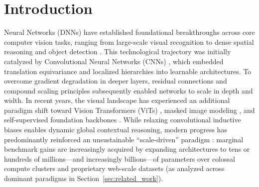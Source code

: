 \section{Introduction}
 Neural Networks (DNNs) have established foundational breakthroughs across core computer vision tasks, ranging from large-scale visual recognition \cite{8, 19} to dense spatial reasoning and object detection \cite{10, 37}. This technological trajectory was initially catalyzed by Convolutional Neural Networks (CNNs) \cite{15, 18}, which embedded translation equivariance and localized hierarchies into learnable architectures. To overcome gradient degradation in deeper layers, residual connections \cite{10} and compound scaling principles \cite{30} subsequently enabled networks to scale in depth and width. In recent years, the visual landscape has experienced an additional paradigm shift toward Vision Transformers (ViTs) \cite{6, 33}, masked image modeling \cite{34}, and self-supervised foundation backbones \cite{1}. While relaxing convolutional inductive biases enables dynamic global contextual reasoning, modern progress has predominantly reinforced an unsustainable ``scale-driven'' paradigm \cite{32}: marginal benchmark gains are increasingly acquired by expanding architectures to tens or hundreds of millions---and increasingly billions---of parameters over colossal compute clusters and proprietary web-scale datasets \cite{8, 32} (as analyzed across dominant paradigms in Section~\ref{sec:related_work}).

